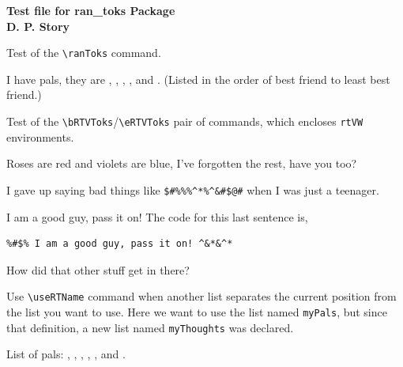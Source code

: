 \documentclass{article}
\begin{document}
\begin{center}\bfseries
    Test file for \textsf{ran\_toks} Package\\[3pt]
        D. P. Story
\end{center}

Test of the \verb!\ranToks! command.

I have {} pals, they are , ,
, , {} and . (Listed
in the order of best friend to least best friend.)

Test of the \verb!\bRTVToks!/\verb!\eRTVToks! pair of commands, which encloses
\texttt{rtVW} environments.

%
\begin{rtVW}
\begin{minipage}[t]{.67\linewidth}
Roses are red and violets are blue,
I've forgotten the rest, have you too?
\end{minipage}
\end{rtVW}
\begin{rtVW}
\begin{minipage}[t]{.67\linewidth}
I gave up saying bad things like
\verb!$#%%%^*%^&#$@#! when I was just a teenager.
\end{minipage}
\end{rtVW}
\begin{rtVW}
\begin{minipage}[t]{.67\linewidth}
I am a good guy, pass it on! The code for this last sentence is,
\begin{verbatim}
%#$% I am a good guy, pass it on! ^&*&^*
\end{verbatim}
How did that other stuff get in there?
\end{minipage}
\end{rtVW}
\eRTVToks
\begin{enumerate}
\end{enumerate}

Use \verb!\useRTName! command when another list separates the current
position from the list you want to use. Here we want to use the list named
\texttt{myPals}, but since that definition, a new list named
\texttt{myThoughts} was declared.

List of pals: , , ,
, , and .
\end{document}
